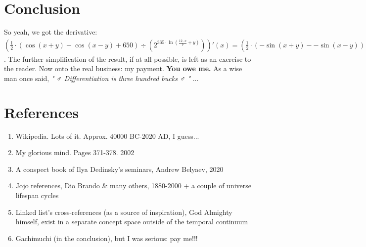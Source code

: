 \documentclass[12pt]{article}
\begin{document}
\begin{fleqn}[\parindent]
\section{\Large{Conclusion}}
So yeah, we got the derivative: 
$ \left(\frac{ 1 }{ 2 } \cdot (\cos ( x  +  y ) - \cos ( x  -  y ) +  650 ) \div ({ 2 }^{ 365  \cdot \ln (\frac{ 12  \cdot  x }{ 7 } +  y )})\right)'\left(x\right) = (\frac{ 1 }{ 2 } \cdot (- \sin ( x  +  y ) - - \sin ( x  -  y )) \cdot { 2 }^{ 365  \cdot \ln (\frac{ 12  \cdot  x }{ 7 } +  y )} - \frac{ 1 }{ 2 } \cdot (\cos ( x  +  y ) - \cos ( x  -  y ) +  650 ) \cdot \ln  2  \cdot { 2 }^{ 365  \cdot \ln (\frac{ 12  \cdot  x }{ 7 } +  y )} \cdot  365  \cdot \frac{\frac{ 84 }{ 49 }}{\frac{ 12  \cdot  x }{ 7 } +  y }) \div ({({ 2 }^{ 365  \cdot \ln (\frac{ 12  \cdot  x }{ 7 } +  y )})}^{ 2 }) $. 
The further simplification of the result, if at all possible, is left as an exercise to the reader.
Now onto the real business: my payment. \textbf{You owe me.}
As a wise man once said, \textit{" ♂ Differentiation is three hundred bucks ♂ "} ...
\section{\Large{References}}
\begin{enumerate}
\item Wikipedia. Lots of it. Approx. 40000 BC-2020 AD, I guess...
\item My glorious mind. Pages 371-378. 2002
\item A conspect book of Ilya Dedinsky's seminars, Andrew Belyaev, 2020
\item Jojo references, Dio Brando \& many others, 1880-2000 + a couple of universe lifespan cycles
\item Linked list's cross-references (as a source of inspiration), God Almighty himself, exist in a separate concept space outside of the temporal continuum
\item Gachimuchi (in the conclusion), but I was serious: pay me!!!
\end{enumerate}
\end{fleqn}
\end{document}
